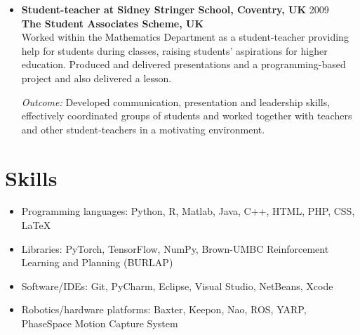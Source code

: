 \documentclass[10pt,letterpaper]{article}
\newcommand{\thing}[2]{{#1} \hfill {#2}}
\begin{document}
\begin{itemize}
\item \thing{\bf Student-teacher at Sidney Stringer School, Coventry, UK}{2009}\\
        {\bf The Student Associates Scheme, UK}\vspace{0.5em}\\
	Worked within the Mathematics Department as a student-teacher providing help for students during classes, raising students' aspirations for higher education. Produced and delivered presentations and a programming-based project and also delivered a lesson. 
	
	{\it Outcome:} Developed communication, presentation and leadership skills, effectively coordinated groups of students and worked together with teachers and other student-teachers in a motivating environment.

%	

\end{itemize}

\section{Skills}
\begin{itemize}%
\item Programming languages: Python, R, Matlab, Java, C++, HTML, PHP, CSS, LaTeX
\item Libraries: PyTorch, TensorFlow, NumPy, Brown-UMBC Reinforcement Learning and Planning (BURLAP)
\item Software/IDEs: Git, PyCharm, Eclipse, Visual Studio, NetBeans, Xcode
\item Robotics/hardware platforms: Baxter, Keepon, Nao, ROS, YARP, PhaseSpace Motion Capture System
\end{itemize}
\end{document}
